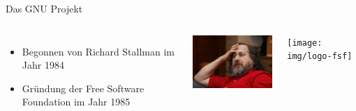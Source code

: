 \documentclass[12pt, xcolor={svgnames,table}]{beamer}
\begin{document}
\begin{frame}{Das GNU Projekt}
  \begin{columns}
    \column{6cm}

    \begin{itemize}
      \item Begonnen von Richard Stallman im Jahr 1984 
      \item Gründung der Free Software Foundation im Jahr 1985 
    \end{itemize}

    \column{7cm}

    \begin{center}
      \includegraphics[width=4.5cm]{img/stallman}
    \par\end{center}

    \begin{center}
      \texttt{[image: img/logo-fsf]}
    \par\end{center}
  \end{columns}
\end{frame}
\end{document}
